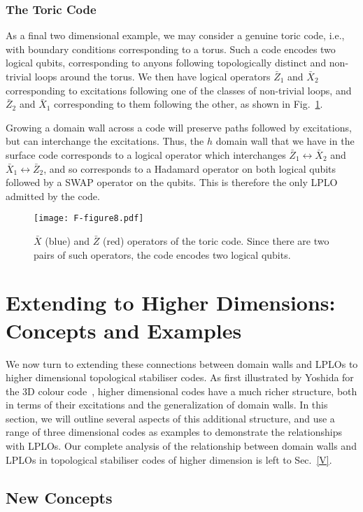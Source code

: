 \documentclass[pra,twocolumn,a4paper,nofootinbib]{revtex4-1}
\begin{document}
\subsubsection{The Toric Code}
As a final two dimensional example, we may consider a genuine toric code, i.e., with boundary conditions corresponding to a torus. Such a code encodes two logical qubits, corresponding to anyons following topologically distinct and non-trivial loops around the torus. We then have logical operators $\bar{Z}_1$ and $\bar{X}_2$ corresponding to excitations following one of the classes of non-trivial loops, and $\bar{Z}_2$ and $\bar{X}_1$ corresponding to them following the other, as shown in Fig.~\ref{fig:TC}.

Growing a domain wall across a code will preserve paths followed by excitations, but can interchange the excitations. Thus, the $h$ domain wall that we have in the surface code corresponds to a logical operator which interchanges $\bar{Z}_1 \leftrightarrow \bar{X}_2$ and $\bar{X}_1 \leftrightarrow \bar{Z}_2$, and so corresponds to a Hadamard operator on both logical qubits followed by a SWAP operator on the qubits. This is therefore the only LPLO admitted by the code.

\begin{figure}
\centering
\texttt{[image: F-figure8.pdf]}
\caption{$\bar{X}$ (blue) and $\bar{Z}$ (red) operators of the toric code. Since there are two pairs of such operators, the code encodes two logical qubits. \label{fig:TC}}
\end{figure}

\section{Extending to Higher Dimensions: Concepts and Examples}
\label{IV}
We now turn to extending these connections between domain walls and LPLOs to higher dimensional topological stabiliser codes.  As first illustrated by Yoshida for the 3D colour code~\cite{YoshidaA}, higher dimensional codes have a much richer structure, both in terms of their excitations and the generalization of domain walls.  In this section, we will outline several aspects of this additional structure, and use a range of three dimensional codes as examples to demonstrate the relationships with LPLOs.  Our complete analysis of the relationship between domain walls and LPLOs in topological stabiliser codes of higher dimension is left to Sec.~\ref{V}.

\subsection{New Concepts}
\end{document}

